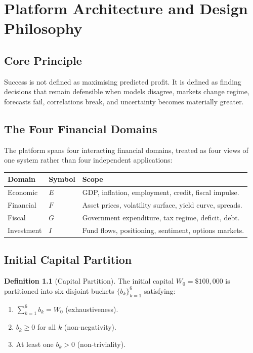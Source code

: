 \documentclass[12pt,openany]{book}
\newcommand{\calE}{\mathcal{E}}
\newcommand{\calF}{\mathcal{F}}
\newcommand{\calG}{\mathcal{G}}
\newcommand{\calI}{\mathcal{I}}
\numberwithin{equation}{chapter}
\theoremstyle{plain}
\theoremstyle{definition}
\newtheorem{definition}[theorem]{Definition}
\theoremstyle{remark}
\renewcommand{\arraystretch}{1.2}
\def\mathcal#1{#1}%
\def\calE{E}%
\def\calF{F}%
\def\calG{G}%
\def\calI{I}%
\begin{document}
\chapter{Platform Architecture and Design Philosophy}
\label{ch:architecture}

\section{Core Principle}

\noindent
Success is not defined as maximising predicted profit.  It is
defined as finding decisions that remain defensible when models
disagree, markets change regime, forecasts fail, correlations
break, and uncertainty becomes materially greater.

\section{The Four Financial Domains}

The platform spans four interacting financial domains, treated as
four views of one system rather than four independent applications:

\begin{center}
\renewcommand{\arraystretch}{1.35}
\begin{tabularx}{\textwidth}{@{} l l X @{}}
\toprule
\textbf{Domain} & \textbf{Symbol} & \textbf{Scope} \\
\midrule
Economic & $\calE$ & GDP, inflation, employment, credit, fiscal impulse. \\
Financial & $\calF$ & Asset prices, volatility surface, yield curve, spreads. \\
Fiscal & $\calG$ & Government expenditure, tax regime, deficit, debt. \\
Investment & $\calI$ & Fund flows, positioning, sentiment, options markets. \\
\bottomrule
\end{tabularx}
\end{center}

\section{Initial Capital Partition}

\begin{definition}[Capital Partition]
\label{def:partition}
The initial capital $W_0 = \$100{,}000$ is partitioned into six
disjoint buckets $\{b_k\}_{k=1}^{6}$ satisfying:
\begin{enumerate}[label=\textbf{(P\arabic*)}]
  \item $\sum_{k=1}^{6} b_k = W_0$ (exhaustiveness).
  \item $b_k \geq 0$ for all $k$ (non-negativity).
  \item At least one $b_k > 0$ (non-triviality).
\end{enumerate}
\end{definition}
\end{document}
